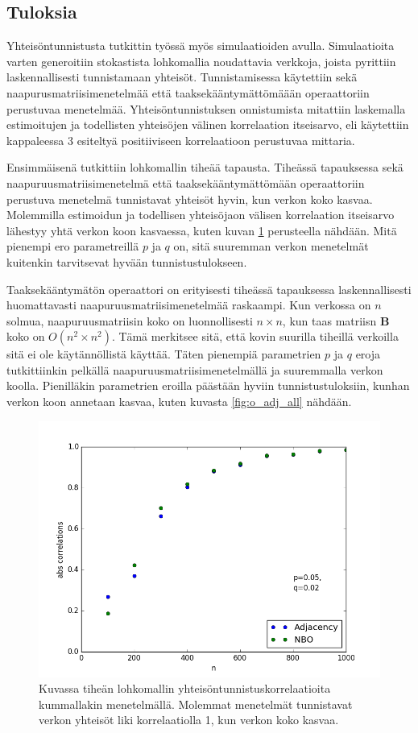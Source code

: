 \documentclass[finnish,12pt,a4paper,pdftex,sci,utf8]{aaltothesis}
\begin{document}
\subsection{Tuloksia}
Yhteisöntunnistusta tutkittin työssä myös simulaatioiden avulla. Simulaatioita varten generoitiin stokastista lohkomallia noudattavia verkkoja, joista pyrittiin laskennallisesti tunnistamaan yhteisöt. Tunnistamisessa käytettiin sekä naapurusmatriisimenetelmää että taaksekääntymättömäään operaattoriin perustuvaa menetelmää. Yhteisöntunnistuksen onnistumista mitattiin laskemalla estimoitujen ja todellisten yhteisöjen välinen korrelaation itseisarvo, eli käytettiin kappaleessa 3 esiteltyä positiiviseen korrelaatioon perustuvaa mittaria.

Ensimmäisenä tutkittiin lohkomallin tiheää tapausta. Tiheässä tapauksessa sekä naapuruusmatriisimenetelmä että taaksekääntymättömään operaattoriin perustuva menetelmä tunnistavat yhteisöt hyvin, kun verkon koko kasvaa. Molemmilla estimoidun ja todellisen yhteisöjaon välisen korrelaation itseisarvo lähestyy yhtä verkon koon kasvaessa, kuten kuvan \ref{fig:dense} perusteella nähdään. Mitä pienempi ero parametreillä $p$ ja $q$ on, sitä suuremman verkon menetelmät kuitenkin tarvitsevat hyvään tunnistustulokseen.

Taaksekääntymätön operaattori on erityisesti tiheässä tapauksessa laskennallisesti huomattavasti naapuruusmatriisimenetelmää raskaampi. Kun verkossa on $n$ solmua, naapuruusmatriisin koko on luonnollisesti $n \times n$, kun taas matriisn $\mathbf{B}$ koko on $O(n^2 \times n^2)$. Tämä merkitsee sitä, että kovin suurilla tiheillä verkoilla sitä ei ole käytännöllistä käyttää. Täten pienempiä parametrien $p$ ja $q$ eroja tutkittiinkin pelkällä naapuruusmatriisimenetelmällä ja suuremmalla verkon koolla. Pienilläkin parametrien eroilla päästään hyviin tunnistustuloksiin, kunhan verkon koon annetaan kasvaa, kuten kuvasta \ref{fig:o_adj_all} nähdään.

\begin{figure}
	\centering
	\includegraphics[width = \textwidth]{adj_nbo_den_2.png}
	\caption{Kuvassa tiheän lohkomallin yhteisöntunnistuskorrelaatioita kummallakin menetelmällä. Molemmat menetelmät tunnistavat verkon yhteisöt liki korrelaatiolla 1, kun verkon koko kasvaa.}
	\label{fig:dense}
\end{figure}
\end{document}
